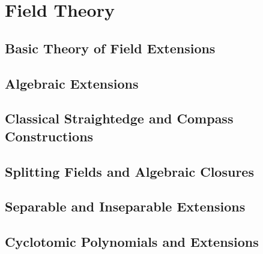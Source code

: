 \chapter{Field Theory}

\section{Basic Theory of Field Extensions}

\section{Algebraic Extensions}

\section{Classical Straightedge and Compass Constructions}

\section{Splitting Fields and Algebraic Closures}

\section{Separable and Inseparable Extensions}

\section{Cyclotomic Polynomials and Extensions}

